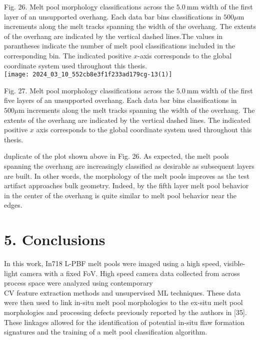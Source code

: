 \documentclass[10pt]{article}
\begin{document}
Fig. 26. Melt pool morphology classifications across the $5.0 \mathrm{~mm}$ width of the first layer of an unsupported overhang. Each data bar bins classifications in $500 \mu \mathrm{m}$ increments along the melt tracks spanning the width of the overhang. The extents of the overhang are indicated by the vertical dashed lines.The values in parantheses indicate the number of melt pool classifications included in the corresponding bin. The indicated positive $x$-axis corresponds to the global coordinate system used throughout this thesis.\\
\texttt{[image: 2024\_03\_10\_552cb8e3f1f233ad179cg-13(1)]}

Fig. 27. Melt pool morphology classifications across the $5.0 \mathrm{~mm}$ width of the first five layers of an unsupported overhang. Each data bar bins classifications in $500 \mu \mathrm{m}$ increments along the melt tracks spanning the width of the overhang. The extents of the overhang are indicated by the vertical dashed lines. The indicated positive $x$ axis corresponds to the global coordinate system used throughout this thesis.

duplicate of the plot shown above in Fig. 26. As expected, the melt pools spanning the overhang are increasingly classified as desirable as subsequent layers are built. In other words, the morphology of the melt pools improves as the test artifact approaches bulk geometry. Indeed, by the fifth layer melt pool behavior in the center of the overhang is quite similar to melt pool behavior near the edges.

\section*{5. Conclusions}
In this work, In718 L-PBF melt pools were imaged using a high speed, visible-light camera with a fixed FoV. High speed camera data collected from across process space were analyzed using contemporary\\
CV feature extraction methods and unsupervised ML techniques. These data were then used to link in-situ melt pool morphologies to the ex-situ melt pool morphologies and processing defects previously reported by the authors in [35]. These linkages allowed for the identification of potential in-situ flaw formation signatures and the training of a melt pool classification algorithm.
\end{document}
